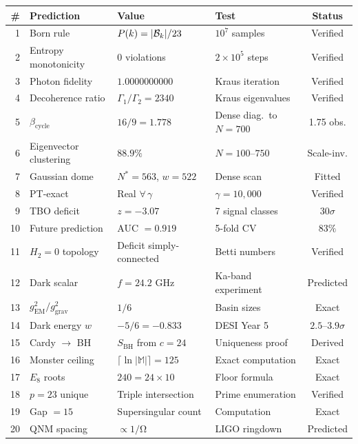 \documentclass[12pt,a4paper]{article}
\theoremstyle{definition}\newtheorem{definition}[theorem]{Definition}
\theoremstyle{remark}\newtheorem{remark}[theorem]{Remark}
\renewcommand{\O}{\mathrm{\Omega}}
\newcommand{\Monster}{\mathbb{M}}\newcommand{\Leech}{\Lambda_{24}}
\begin{document}
\begin{center}
\small
\begin{tabular}{rlllc}
\toprule
\# & \textbf{Prediction} & \textbf{Value} & \textbf{Test} & \textbf{Status} \\
\midrule
1 & Born rule & $P(k) = |\mathcal{B}_k|/23$ & $10^7$ samples & \textcolor{proved}{Verified} \\
2 & Entropy monotonicity & 0 violations & $2 \times 10^5$ steps & \textcolor{proved}{Verified} \\
3 & Photon fidelity & $1.0000000000$ & Kraus iteration & \textcolor{proved}{Verified} \\
4 & Decoherence ratio & $\Gamma_1/\Gamma_2 = 2340$ & Kraus eigenvalues & \textcolor{proved}{Verified} \\
5 & $\beta_{\mathrm{cycle}}$ & $16/9 = 1.778$ & Dense diag.\ to $N = 700$ & \textcolor{computational}{1.75 obs.} \\
6 & Eigenvector clustering & $88.9\%$ & $N = 100$--$750$ & \textcolor{proved}{Scale-inv.} \\
7 & Gaussian dome & $N^* = 563$, $w = 522$ & Dense scan & \textcolor{computational}{Fitted} \\
8 & PT-exact & Real $\forall\,\gamma$ & $\gamma = 10{,}000$ & \textcolor{proved}{Verified} \\
9 & TBO deficit & $z = -3.07$ & 7 signal classes & \textcolor{computational}{$30\sigma$} \\
10 & Future prediction & AUC $= 0.919$ & 5-fold CV & \textcolor{computational}{$83\%$} \\
11 & $H_2 = 0$ topology & Deficit simply-connected & Betti numbers & \textcolor{computational}{Verified} \\
12 & Dark scalar & $f = 24.2$ GHz & Ka-band experiment & \textcolor{conjectural}{Predicted} \\
13 & $g_{\mathrm{EM}}^2/g_{\mathrm{grav}}^2$ & $1/6$ & Basin sizes & \textcolor{proved}{Exact} \\
14 & Dark energy $w$ & $-5/6 = -0.833$ & DESI Year 5 & \textcolor{conjectural}{$2.5$--$3.9\sigma$} \\
15 & Cardy $\to$ BH & $S_{\mathrm{BH}}$ from $c = 24$ & Uniqueness proof & \textcolor{conditional}{Derived} \\
16 & Monster ceiling & $\lceil\ln|\Monster|\rceil = 125$ & Exact computation & \textcolor{proved}{Exact} \\
17 & $E_8$ roots & $240 = 24 \times 10$ & Floor formula & \textcolor{proved}{Exact} \\
18 & $p = 23$ unique & Triple intersection & Prime enumeration & \textcolor{proved}{Verified} \\
19 & Gap $= 15$ & Supersingular count & Computation & \textcolor{proved}{Exact} \\
20 & QNM spacing & $\propto 1/\O$ & LIGO ringdown & \textcolor{conjectural}{Predicted} \\
\bottomrule
\end{tabular}
\end{center}
\end{document}

